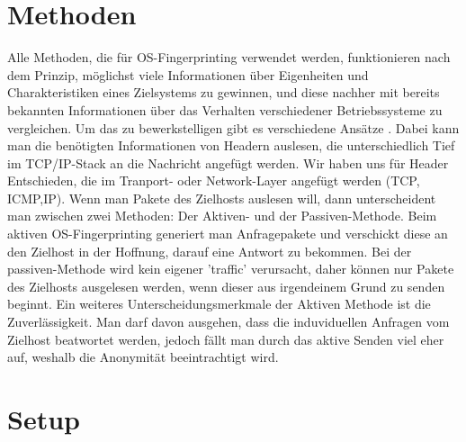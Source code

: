 \documentclass{article} %
\begin{document}
\section{Methoden}
Alle Methoden, die für OS-Fingerprinting verwendet werden, funktionieren nach dem Prinzip, möglichst viele Informationen über Eigenheiten und Charakteristiken eines Zielsystems zu gewinnen, und diese nachher mit bereits bekannten Informationen über das Verhalten verschiedener Betriebssysteme zu vergleichen. Um das zu bewerkstelligen gibt es verschiedene Ansätze \cite{forensicswiki}. Dabei kann man die benötigten Informationen von Headern auslesen, die unterschiedlich Tief im TCP/IP-Stack an die Nachricht angefügt werden. Wir haben uns für Header Entschieden, die im Tranport- oder Network-Layer angefügt werden (TCP, ICMP,IP). Wenn man Pakete des Zielhosts auslesen will, dann unterscheident man zwischen zwei Methoden: Der Aktiven- und der Passiven-Methode. Beim aktiven OS-Fingerprinting generiert man Anfragepakete und verschickt diese an den Zielhost in der Hoffnung, darauf eine Antwort zu bekommen. Bei der passiven-Methode wird kein eigener 'traffic' verursacht, daher können nur Pakete des Zielhosts ausgelesen werden, wenn dieser aus irgendeinem Grund zu senden beginnt. Ein weiteres Unterscheidungsmerkmale der Aktiven Methode ist die Zuverlässigkeit. Man darf davon ausgehen, dass die induviduellen Anfragen vom Zielhost beatwortet werden, jedoch fällt man durch das aktive Senden viel eher auf, weshalb die Anonymität beeintrachtigt wird.

\section{Setup}
\end{document}
